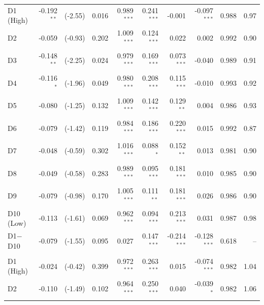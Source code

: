 \begin{table}[!htbp]
{\begin{tabular*}{\linewidth}{@{\extracolsep{\fill}}lrrrrrrrrr}
\hspace{1em}D1 (High) & -0.192$^{**}$ & (-2.55) & 0.016 & 0.989$^{***}$ & 0.241$^{***}$ & -0.001 & -0.097$^{***}$ & 0.988 & 0.97\\
\hspace{1em}D2 & -0.059 & (-0.93) & 0.202 & 1.009$^{***}$ & 0.124$^{***}$ & 0.022 & 0.002 & 0.992 & 0.90\\
\hspace{1em}D3 & -0.148$^{**}$ & (-2.25) & 0.024 & 0.979$^{***}$ & 0.169$^{***}$ & 0.073$^{***}$ & -0.040 & 0.989 & 0.91\\
\hspace{1em}D4 & -0.116$^{*}$ & (-1.96) & 0.049 & 0.980$^{***}$ & 0.208$^{***}$ & 0.115$^{***}$ & -0.010 & 0.993 & 0.92\\
\hspace{1em}D5 & -0.080 & (-1.25) & 0.132 & 1.009$^{***}$ & 0.142$^{***}$ & 0.129$^{**}$ & 0.004 & 0.986 & 0.93\\
\hspace{1em}D6 & -0.079 & (-1.42) & 0.119 & 0.984$^{***}$ & 0.186$^{***}$ & 0.220$^{***}$ & 0.015 & 0.992 & 0.87\\
\hspace{1em}D7 & -0.048 & (-0.59) & 0.302 & 1.016$^{***}$ & 0.088$^{*}$ & 0.152$^{**}$ & 0.013 & 0.981 & 0.90\\
\hspace{1em}D8 & -0.049 & (-0.58) & 0.283 & 0.989$^{***}$ & 0.095$^{***}$ & 0.181$^{***}$ & 0.010 & 0.985 & 0.90\\
\hspace{1em}D9 & -0.079 & (-0.98) & 0.170 & 1.005$^{***}$ & 0.111$^{**}$ & 0.181$^{***}$ & 0.026 & 0.986 & 0.90\\
\hspace{1em}D10 (Low) & -0.113 & (-1.61) & 0.069 & 0.962$^{***}$ & 0.094$^{***}$ & 0.213$^{***}$ & 0.031 & 0.987 & 0.98\\
\hspace{1em}D1$-$D10 & -0.079 & (-1.55) & 0.095 & 0.027 & 0.147$^{***}$ & -0.214$^{***}$ & -0.128$^{***}$ & 0.618 & --\\
\addlinespace[0.3em]
\hline
\multicolumn{10}{l}{\textit{Panel T2: Middle activeness tercile}}\\
\hspace{1em}D1 (High) & -0.024 & (-0.42) & 0.399 & 0.972$^{***}$ & 0.263$^{***}$ & 0.015 & -0.074$^{***}$ & 0.982 & 1.04\\
\hspace{1em}D2 & -0.110 & (-1.49) & 0.102 & 0.964$^{***}$ & 0.250$^{***}$ & 0.040 & -0.039$^{*}$ & 0.982 & 1.06\\

\end{tabular*}}
\end{table}
